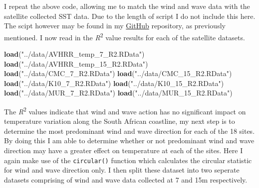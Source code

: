 \documentclass[10pt,a4,]{article}
\newenvironment{Shaded}{\begin{snugshade}}{\end{snugshade}}
\newcommand{\CommentTok}[1]{\textcolor[rgb]{0.56,0.35,0.01}{\textit{#1}}}
\newcommand{\DecValTok}[1]{\textcolor[rgb]{0.00,0.00,0.81}{#1}}
\newcommand{\KeywordTok}[1]{\textcolor[rgb]{0.13,0.29,0.53}{\textbf{#1}}}
\newcommand{\NormalTok}[1]{#1}
\newcommand{\OperatorTok}[1]{\textcolor[rgb]{0.81,0.36,0.00}{\textbf{#1}}}
\newcommand{\StringTok}[1]{\textcolor[rgb]{0.31,0.60,0.02}{#1}}
\begin{document}
\begin{Shaded}
\end{Shaded}

I repeat the above code, allowing me to match the wind and wave data
with the satellite collected SST data. Due to the length of script I do
not include this here. The scipt however may be found in my
\href{https://github.com/amierohabrahams/HONOURSPROJECT}{GitHub}
repository, as previously mentioned. I now read in the
\emph{R}\textsuperscript{2} value results for each of the satellite
datasets.

\begin{Shaded}
\begin{Highlighting}[]
\KeywordTok{load}\NormalTok{(}\StringTok{"../data/AVHRR_temp_7_R2.RData"}\NormalTok{)}
\KeywordTok{load}\NormalTok{(}\StringTok{"../data/AVHRR_temp_15_R2.RData"}\NormalTok{)}
\KeywordTok{load}\NormalTok{(}\StringTok{"../data/CMC_7_R2.RData"}\NormalTok{)}
\KeywordTok{load}\NormalTok{(}\StringTok{"../data/CMC_15_R2.RData"}\NormalTok{)}
\KeywordTok{load}\NormalTok{(}\StringTok{"../data/K10_7_R2.RData"}\NormalTok{)}
\KeywordTok{load}\NormalTok{(}\StringTok{"../data/K10_15_R2.RData"}\NormalTok{)}
\KeywordTok{load}\NormalTok{(}\StringTok{"../data/MUR_7_R2.RData"}\NormalTok{)}
\KeywordTok{load}\NormalTok{(}\StringTok{"../data/MUR_15_R2.RData"}\NormalTok{)}
\end{Highlighting}
\end{Shaded}

The \emph{R}\textsuperscript{2} values indicate that wind and wave
action has no significant impact on temperature variation along the
South African coastline, my next step is to determine the most
predominant wind and wave direction for each of the 18 sites. By doing
this I am able to determine whether or not predominant wind and wave
direction may have a greater effect on temperature at each of the sites.
Here I again make use of the \texttt{circular()} function which
calculates the circular statistic for wind and wave direction only. I
then split these dataset into two seperate datasets comprising of wind
and wave data collected at 7 and 15m respectively.
\end{document}
